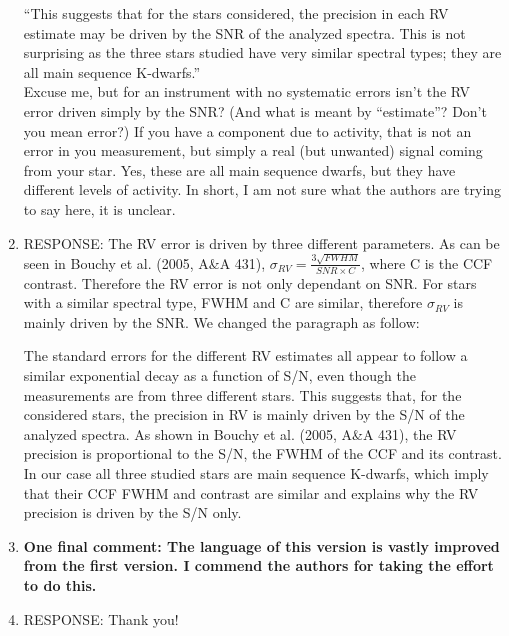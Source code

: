 \documentclass[11pt]{article}   	%
\begin{document}
\begin{enumerate}
{``This suggests that for the stars considered, the precision in each RV estimate may be driven by the SNR of the analyzed spectra. This is not surprising as the three stars studied have very similar spectral types; they are all main sequence K-dwarfs.'' \\

Excuse me, but for an instrument with no systematic errors isn't the RV error driven simply by the SNR? (And what is meant by ``estimate''? Don't you mean error?) If you have a component due to activity, that is not an error in you measurement, but simply a real (but unwanted) signal coming from your star. Yes, these are all main sequence dwarfs, but they have different levels of activity. In short, I am not sure what the authors are trying to say here, it is unclear.}
%
\item[]  RESPONSE:  The RV error is driven by three different parameters. As can be seen in Bouchy et al. (2005, A\&A 431), $\sigma_{RV} = \frac{3\sqrt{FWHM}}{SNR\times C}$, where C is the CCF contrast. Therefore the RV error is not only dependant on SNR. For stars with a similar spectral type, FWHM and C are similar, therefore $\sigma_{RV}$ is mainly driven by the SNR.
We changed the paragraph as follow: 

The standard errors for the different RV estimates all appear to follow a similar exponential decay as a function of S/N, even though the measurements are from three different stars. This suggests that, for the considered stars, the precision in RV is mainly driven by the S/N of the analyzed spectra. As shown in Bouchy et al. (2005, A\&A 431), the RV precision is proportional to the S/N, the FWHM of the CCF and its contrast. In our case all three studied stars are main sequence K-dwarfs, which imply that their CCF FWHM and contrast are similar and explains why the RV precision is driven by the S/N only.



\bigskip
%
%
\item {\bf One final comment: The language of this version is vastly improved from the first version. I commend the authors for taking the effort to do this.}
%
\item[]  RESPONSE:  Thank you!
\bigskip
%
%
\end{enumerate}
\end{document}
